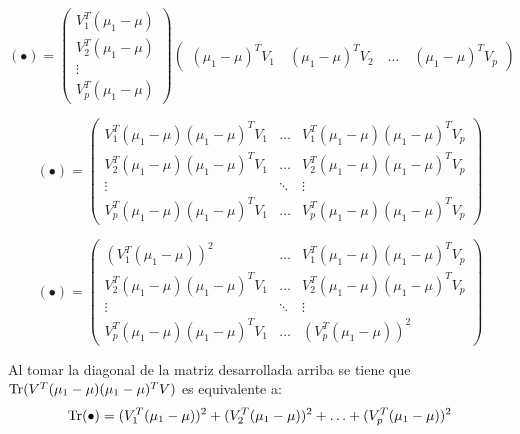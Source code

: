 \begin{equation*}
(\bullet)= \left(\!
    \begin{array}{c}
      V_1^T (\mu_1-\mu)\\
      V_2^T (\mu_1-\mu)\\
      \vdots \\
      V_p^T (\mu_1-\mu)
    \end{array}
  \!\right) 
  \left(\!\begin{array}{c}
      (\mu_1-\mu)^T V_1 \quad
      (\mu_1-\mu)^T V_2 \quad
      \hdots \quad
      (\mu_1-\mu)^T V_p
    \end{array}
  \!\right) 
\end{equation*} 

\vspace{5mm}

\begin{equation*}
(\bullet)= \left(\!
    \begin{array}{ccc}
      V_1^T (\mu_1-\mu) (\mu_1-\mu)^T V_1 & \hdots & V_1^T (\mu_1-\mu) (\mu_1-\mu)^T V_p  \\
      V_2^T (\mu_1-\mu) (\mu_1-\mu)^T V_1 & \hdots & V_2^T (\mu_1-\mu) (\mu_1-\mu)^T V_p  \\
      \vdots & \ddots & \vdots\\
      V_p^T (\mu_1-\mu) (\mu_1-\mu)^T V_1 & \hdots & V_p^T (\mu_1-\mu) (\mu_1-\mu)^T V_p
    \end{array}
  \!\right) 
\end{equation*} 

\vspace{5mm}

\begin{equation*}
(\bullet)= \left(\!
    \begin{array}{ccc}
      (V_1^T (\mu_1-\mu))^2 & \hdots & V_1^T (\mu_1-\mu) (\mu_1-\mu)^T V_p \\
       V_2^T (\mu_1-\mu) (\mu_1-\mu)^T V_1  & \hdots & V_2^T (\mu_1-\mu) (\mu_1-\mu)^T V_p  \\
      \vdots & \ddots & \vdots\\
      V_p^T (\mu_1-\mu) (\mu_1-\mu)^T V_1  & \hdots & (V_p^T (\mu_1-\mu))^2
    \end{array}
  \!\right) 
\end{equation*} 

\vspace{5mm}

 Al tomar la diagonal de la matriz desarrollada arriba se tiene que $\operatorname{Tr}(V^T (\mu_1 - \mu) (\mu_1 - \mu)^T V)$ es equivalente a:
 \vspace{3mm}
 \begin{equation*}
\operatorname{Tr}(\bullet) = (V_1^T (\mu_1-\mu))^2+ (V_2^T (\mu_1-\mu) )^2 + \hdots + (V_p^T (\mu_1-\mu) )^2
 \end{equation*}

